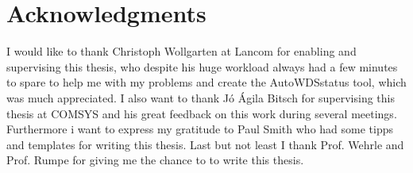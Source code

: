 \cleardoublepage

\chapter*{Acknowledgments}

I would like to thank Christoph Wollgarten at Lancom for enabling and supervising this thesis, who despite his huge workload always had a few minutes to spare
to help me with my problems and create the AutoWDSstatus tool, which was much appreciated.
I also want to thank J\'o \'Agila Bitsch for supervising this thesis at COMSYS and his great feedback on this work during several meetings.
Furthermore i want to express my gratitude to Paul Smith who had some tipps and templates for writing this thesis.
Last but not least I thank Prof. Wehrle and Prof. Rumpe for giving me the chance to to write this thesis.